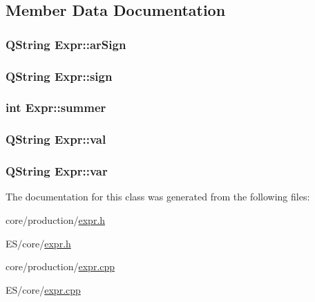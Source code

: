 \subsection{Member Data Documentation}
\hypertarget{class_expr_a61eb93b6686f5905c3cfdd47c7fec997}{
\subsubsection[{arSign}]{\setlength{\rightskip}{0pt plus 5cm}QString {\bf Expr::arSign}}}
\label{class_expr_a61eb93b6686f5905c3cfdd47c7fec997}
\hypertarget{class_expr_a92122d8f14e84486df0a55355d567f1f}{
\subsubsection[{sign}]{\setlength{\rightskip}{0pt plus 5cm}QString {\bf Expr::sign}}}
\label{class_expr_a92122d8f14e84486df0a55355d567f1f}
\hypertarget{class_expr_ac0a6b22ed02b1292a14332d2c03a534f}{
\subsubsection[{summer}]{\setlength{\rightskip}{0pt plus 5cm}int {\bf Expr::summer}}}
\label{class_expr_ac0a6b22ed02b1292a14332d2c03a534f}
\hypertarget{class_expr_aaf68d9135f3f9146570e1bb56a2a0e09}{
\subsubsection[{val}]{\setlength{\rightskip}{0pt plus 5cm}QString {\bf Expr::val}}}
\label{class_expr_aaf68d9135f3f9146570e1bb56a2a0e09}
\hypertarget{class_expr_ae3f93c6eca1ca9c9f250c11d8fef0abe}{
\subsubsection[{var}]{\setlength{\rightskip}{0pt plus 5cm}QString {\bf Expr::var}}}
\label{class_expr_ae3f93c6eca1ca9c9f250c11d8fef0abe}


The documentation for this class was generated from the following files:\begin{DoxyCompactItemize}
\item 
core/production/\hyperlink{core_2production_2expr_8h}{expr.h}\item 
ES/core/\hyperlink{_e_s_2core_2expr_8h}{expr.h}\item 
core/production/\hyperlink{core_2production_2expr_8cpp}{expr.cpp}\item 
ES/core/\hyperlink{_e_s_2core_2expr_8cpp}{expr.cpp}\end{DoxyCompactItemize}
